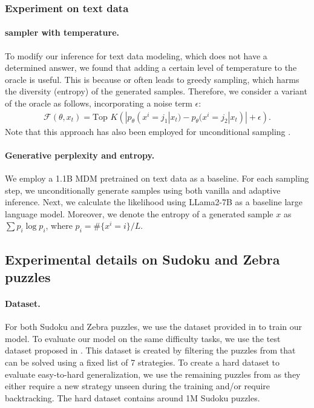 \subsubsection{Experiment on text data}

\paragraph{\topkprobdiff sampler with temperature.}
To modify our inference for text data modeling, which does not have a determined answer, we found that adding a certain level of temperature to the oracle is useful. This is because \topkprobdiff or \topk often leads to greedy sampling, which harms the diversity (entropy) of the generated samples. Therefore, we consider a variant of the oracle as follows, incorporating a noise term $\epsilon$:
\begin{align*}
    \mathcal{F}(\theta, x_t) = \text{Top } K \left(| p_\theta(x^i = j_1 | x_t) - p_\theta(x^i = j_2 | x_t) | + \epsilon \right).
\end{align*}
Note that this approach has also been employed for unconditional sampling \cite{wang2024diffusion,zheng2024reparameterized}.

\paragraph{Generative perplexity and entropy.} 
We employ a 1.1B MDM pretrained on text data as a baseline. For each sampling step, we unconditionally generate samples using both vanilla and adaptive inference. Next, we calculate the likelihood using LLama2-7B as a baseline large language model. Moreover, we denote the entropy of a generated sample $x$ as  $\sum p_i \log p_i$, where $p_i = \# \{x^i = i \}/L$.


\subsection{Experimental details on Sudoku and Zebra puzzles}
\label{appendix:sudoku-zebra-exp-details}

\paragraph{Dataset.} For both Sudoku and Zebra puzzles, we use the dataset provided in \citet{shah2024causal} to train our model. To evaluate our model on the same difficulty tasks, we use the test dataset proposed in \citet{shah2024causal}. This dataset is created by filtering the puzzles from \cite{david_g__radcliffe_2020} that can be solved using a fixed list of 7 strategies. To create a hard dataset to evaluate easy-to-hard generalization, we use the remaining puzzles from \cite{david_g__radcliffe_2020} as they either require a new strategy unseen during the training and/or require backtracking. The hard dataset contains around 1M Sudoku puzzles.

